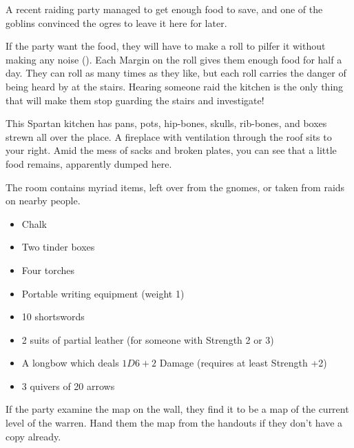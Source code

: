 \begin{multicols}{2}
\begin{exampletext}
  A recent raiding party managed to get enough food to save, and one of the goblins convinced the \glspl{ogre} to leave it here for later.
\end{exampletext}

If the party want the food, they will have to make a  roll to pilfer it without making any noise (\tn[8]).
Each Margin on the roll gives them enough food for half a day.
They can roll as many times as they like, but each roll carries the danger of being heard by  at the stairs.
Hearing someone raid the kitchen is the only thing that will make them stop guarding the stairs and investigate!

\begin{boxtext}
  This Spartan kitchen has pans, pots, hip-bones, skulls, rib-bones, and boxes strewn all over the place.
  A fireplace with ventilation through the roof sits to your right.
  Amid the mess of sacks and broken plates, you can see that a little food remains, apparently dumped here.
\end{boxtext}


The room contains myriad items, left over from the gnomes, or taken from raids on nearby people.

\begin{itemize}
  \item
  Chalk
  \item
  Two tinder boxes
  \item
  Four torches
  \item
  Portable writing equipment (\gls{weight} 1)
  \item
  10 shortswords
  \item
  2 suits of partial leather (for someone with Strength 2 or 3)
    \iftoggle{hardcore}{%
    \item
    1 suit of partial leather (for someone with Strength 1 or 2)
  }{
    \item
    2 suits of partial chain (for someone with Strength 1 or 2)
  }
  \item
  A longbow which deals $1D6+2$ Damage (requires at least Strength +2)
  \item
  3 quivers of 20 arrows
\end{itemize}

If the party examine the map on the wall, they find it to be a map of the current level of the \gls{warren}.
Hand them the map from the handouts if they don't have a copy already.


\end{multicols}
